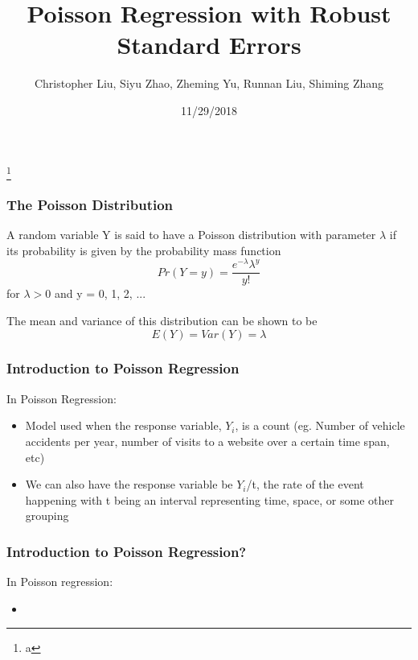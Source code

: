 \documentclass{beamer}
\title{Poisson Regression with Robust Standard Errors}
\author{Christopher Liu, Siyu Zhao, Zheming Yu, Runnan Liu, Shiming Zhang}
\institute{San Diego State University, Stats 610}
\date{11/29/2018}
\begin{document}
	

\begin{frame}[plain]

	\titlepage
	
	\footnote{a}

\end{frame}



\begin{frame}[fragile]\frametitle{The Poisson Distribution}

	A random variable Y is said to have a Poisson distribution with parameter $\lambda$ if its probability is given by the probability mass function
	$$Pr(Y = y) = \frac{e^{-\lambda}\lambda^{y}}{y!}$$
	for $\lambda > 0$ and y = 0, 1, 2, ... 
 
	The mean and variance of this distribution can be shown to be
	$$E(Y) = Var(Y) = \lambda$$ 

\end{frame}



\begin{frame}[fragile]\frametitle{Introduction to Poisson Regression}
	In Poisson Regression:
	
	\begin{itemize}
	
		\item Model used when the response variable, $Y_{i}$, is a count (eg. Number of vehicle accidents per year, number of visits to a website over a certain time span, etc)
		\item We can also have the response variable be $Y_{i}$/t, the rate of the event happening with t being an interval representing time, space, or some other grouping

	\end{itemize}

\end{frame}


\begin{frame}[fragile]\frametitle{Introduction to Poisson Regression?}
	In Poisson regression:
	
	\begin{itemize}
	
		\item 

	\end{itemize}

\end{frame}
\end{document}
